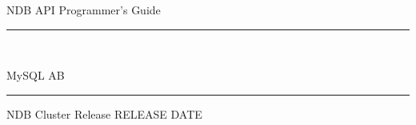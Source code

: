 \documentclass[a4paper]{book}
\begin{document}
\begin{titlepage}
\vspace*{7cm}
\begin{center}
{\Huge NDB API Programmer's Guide \mbox{}\vspace{-3cm}\mbox{}\hrule\bigskip\bigskip\bigskip\bigskip\mbox{}\Huge{}}\\\vspace*{1cm}
\begin{center}\LARGE{MySQL AB}\end{center}\hfill\bigskip\bigskip\bigskip\hrule\bigskip\bigskip\bigskip\bigskip\bigskip\bigskip\bigskip\bigskip\bigskip\bigskip\bigskip\bigskip NDB Cluster Release RELEASE
\bigskip\bigskip\bigskip\bigskip\bigskip\hfill\vspace*{0.5cm}
{\small DATE}\\
\end{center}
\end{titlepage}
\clearemptydoublepage
{}
\tableofcontents
\clearemptydoublepage
{}
\end{document}
